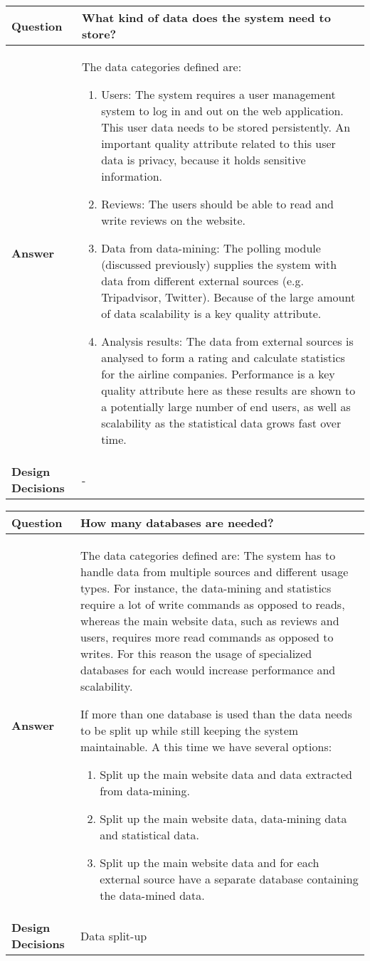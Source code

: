 \begin{longtable}{| l |  p{12cm} |}
\hline
\textbf{Question} & \textbf{What kind of data does the system need to store?} \\ \hline
\textbf{Answer} &
The data categories defined are:
\begin{enumerate}
\item Users: The system requires a user management system to log in and out on the web application. This user data needs to be stored persistently. An important quality attribute related to this user data is privacy, because it holds sensitive information.
\item Reviews: The users should be able to read and write reviews on the website.
\item Data from data-mining: The polling module (discussed previously) supplies the system with data from different external sources (e.g. Tripadvisor, Twitter). Because of the large amount of data scalability is a key quality attribute.
\item Analysis results: The data from external sources is analysed to form a rating and calculate statistics for the airline companies. Performance is a key quality attribute here as these results are shown to a potentially large number of end users, as well as scalability as the statistical data grows fast over time.
\end{enumerate} \\ \hline
\textbf{Design Decisions} & - \\ \hline
\end{longtable}

\newpage
\begin{longtable}{| l |  p{12cm} |}
\hline
\textbf{Question} & \textbf{ How many databases are needed?} \\ \hline
\textbf{Answer} &
The data categories defined are:
The system has to handle data from multiple sources and different usage types. For instance, the data-mining and statistics require a lot of write commands as opposed to reads, whereas the main website data, such as reviews and users, requires more read commands as opposed to writes. For this reason the usage of specialized databases for each would increase performance and scalability.

If more than one database is used than the data needs to be split up while still keeping the system maintainable. 
A this time we have several options:
\begin{enumerate}
\item Split up the main website data and data extracted from data-mining.
\item Split up the main website data, data-mining data and statistical data.
\item Split up the main website data and for each external source have a separate database containing the data-mined data.
\end{enumerate}
 \\ \hline
\textbf{Design Decisions} & Data split-up \\ \hline
\end{longtable}

